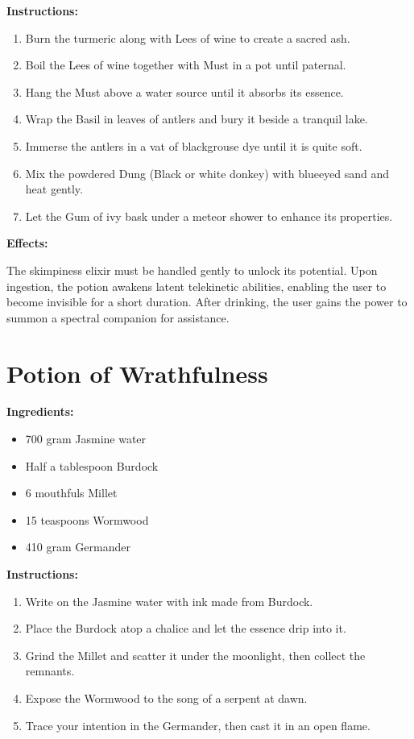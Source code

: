 \documentclass{article}
\begin{document}
\textbf{Instructions:}

\begin{enumerate}
  \item Burn the turmeric along with Lees of wine to create a sacred ash.
  \item Boil the Lees of wine together with Must in a pot until paternal.
  \item Hang the Must above a water source until it absorbs its essence.
  \item Wrap the Basil in leaves of antlers and bury it beside a tranquil lake.
  \item Immerse the antlers in a vat of blackgrouse dye until it is quite soft.
  \item Mix the powdered Dung (Black or white donkey) with blueeyed sand and heat gently.
  \item Let the Gum of ivy bask under a meteor shower to enhance its properties.
\end{enumerate}

\textbf{Effects:}

The skimpiness elixir must be handled gently to unlock its potential. Upon ingestion, the potion awakens latent telekinetic abilities, enabling the user to become invisible for a short duration. After drinking, the user gains the power to summon a spectral companion for assistance.

\newpage
\section*{Potion of Wrathfulness}

\textbf{Ingredients:}

\begin{itemize}
  \item 700 gram Jasmine water
  \item Half a tablespoon Burdock
  \item 6 mouthfuls Millet
  \item 15 teaspoons Wormwood
  \item 410 gram Germander
\end{itemize}

\textbf{Instructions:}

\begin{enumerate}
  \item Write on the Jasmine water with ink made from Burdock.
  \item Place the Burdock atop a chalice and let the essence drip into it.
  \item Grind the Millet and scatter it under the moonlight, then collect the remnants.
  \item Expose the Wormwood to the song of a serpent at dawn.
  \item Trace your intention in the Germander, then cast it in an open flame.
\end{enumerate}
\end{document}
